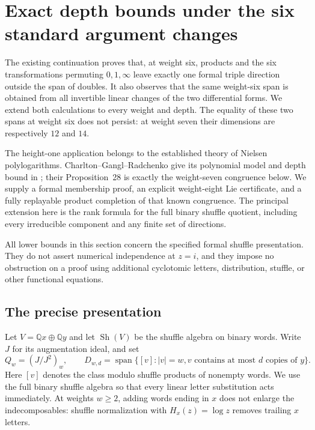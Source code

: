 \section{Exact depth bounds under the six standard argument changes}
\label{gorbit:sec:main}

The existing continuation proves that, at weight six, products and the
six transformations permuting $0,1,\infty$ leave exactly one formal
triple direction outside the span of doubles. It also observes that the
same weight-six span is obtained from all invertible linear changes of
the two differential forms. We extend both calculations to every weight
and depth. The equality of these two spans at weight six does not persist:
at weight seven their dimensions are respectively $12$ and $14$.

The height-one application belongs to the established theory of Nielsen
polylogarithms. Charlton--Gangl--Radchenko give its polynomial model and
depth bound in \cite[\S3.3, Theorem~7]{gorbit:CGR}; their Proposition~28
is exactly the weight-seven congruence below. We supply a formal
membership proof, an explicit weight-eight Lie certificate, and a fully
replayable product completion of that known congruence. The principal
extension here is the rank formula for the full binary shuffle quotient,
including every irreducible component and any finite set of directions.

All lower bounds in this section concern the specified formal shuffle
presentation. They do not assert numerical independence at $z=i$, and
they impose no obstruction on a proof using additional cyclotomic
letters, distribution, stuffle, or other functional equations.

\subsection{The precise presentation}

Let $V=\mathbb Qx\oplus\mathbb Qy$ and let $\operatorname{Sh}(V)$
be the shuffle algebra on binary words. Write $J$ for its augmentation
ideal, and set
\[
 Q_w=(J/J^2)_w,\qquad
 D_{w,d}=\operatorname{span}\{[v]: |v|=w,
                 \text{$v$ contains at most $d$ copies of $y$}\}.
\]
Here $[v]$ denotes the class modulo shuffle products of nonempty words.
We use the full binary shuffle algebra so that every linear letter
substitution acts immediately. At weights $w\ge2$, adding words ending
in $x$ does not enlarge the indecomposables: shuffle normalization with
$H_x(z)=\log z$ removes trailing $x$ letters.

